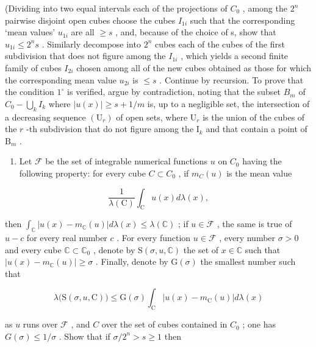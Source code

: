 (Dividing into two equal intervals each of the projections of \(C_{0}\) , among the \(2^{n}\) pairwise disjoint open cubes choose the cubes \(I_{1i}\) such that the corresponding `mean values' \(u_{1i}\) are all \(\geqslant s\) , and, because of the choice of s, show that \(u_{1i} \leqslant 2^{n}s\) . Similarly decompose into \(2^{n}\) cubes each of the cubes of the first subdivision that does not figure among the \(I_{1i}\) , which yields a second finite family of cubes \(I_{2i}\) chosen among all of the new cubes obtained as those for which the corresponding mean value \(u_{2i}\) is \(\leqslant s\) . Continue by recursion. To prove that the condition \(1^{\circ}\) is verified, argue by contradiction, noting that the subset \(B_{m}\) of \(C_{0} - \bigcup_{k} I_{k}\) where \(|u(x)| \geqslant s + 1/m\) is, up to a negligible set, the intersection of a decreasing sequence \((\mathrm{U}_r)\) of open sets, where \(\mathrm{U}_r\) is the union of the cubes of the \(r\) -th subdivision that do not figure among the \(\mathrm{I}_k\) and that contain a point of \(\mathrm{B}_m\) .

\begin{enumerate}
\def\labelenumi{\alph{enumi})}
\setcounter{enumi}{1}
\tightlist
\item
  Let \(\mathcal{F}\) be the set of integrable numerical functions \(u\) on \(C_0\) having the following property: for every cube \(C \subset C_0\) , if \(m_C(u)\) is the mean value
\end{enumerate}

\[
\frac {1}{\lambda (\mathrm{C})} \int_ {\mathrm{C}} u (x) d \lambda (x),
\]

then \(\int_{\mathbb{C}} |u(x) - m_{\mathbb{C}}(u)| d\lambda(x) \leqslant \lambda(\mathbb{C})\) ; if \(u \in \mathcal{F}\) , the same is true of \(u - c\) for every real number \(c\) . For every function \(u \in \mathcal{F}\) , every number \(\sigma > 0\) and every cube \(\mathbb{C} \subset \mathbb{C}_0\) , denote by \(\mathrm{S}(\sigma, u, \mathbb{C})\) the set of \(x \in \mathbb{C}\) such that \(|u(x) - m_{\mathbb{C}}(u)| \geqslant \sigma\) . Finally, denote by \(\mathrm{G}(\sigma)\) the smallest number such that

\[
\lambda \bigl (\mathrm{S} (\sigma , u, \mathrm{C}) \bigr) \leqslant \mathrm{G} (\sigma) \int_ {\mathrm{C}} | u (x) - m _ {\mathrm{C}} (u) | d \lambda (x)
\]

as \(u\) runs over \(\mathcal{F}\) , and \(C\) over the set of cubes contained in \(C_0\) ; one has \(G(\sigma) \leqslant 1 / \sigma\) . Show that if \(\sigma / 2^n > s \geqslant 1\) then

